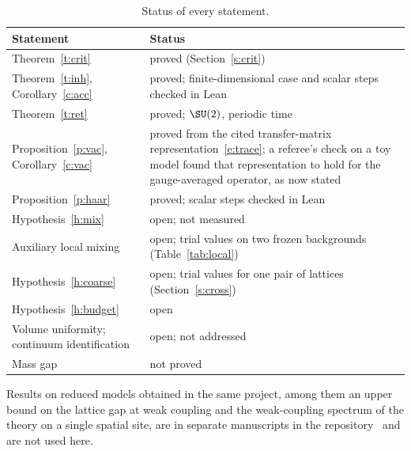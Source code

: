 \begin{table}[ht]
\centering\small
\begin{tabular}{@{}p{}p{}@{}}
\toprule
Statement & Status \\
\midrule
Theorem~\ref{t:crit} & proved (Section~\ref{s:crit}) \\
Theorem~\ref{t:inh}, Corollary~\ref{c:acc} & proved; finite-dimensional case and scalar steps checked in Lean \\
Theorem~\ref{t:ret} & proved; $\SU(2)$, periodic time \\
Proposition~\ref{p:vac}, Corollary~\ref{c:vac} & proved from the cited transfer-matrix representation~\eqref{e:trace}; a referee's check on a toy model found that representation to hold for the gauge-averaged operator, as now stated \\
Proposition~\ref{p:haar} & proved; scalar steps checked in Lean \\
Hypothesis~\ref{h:mix} & open; not measured \\
Auxiliary local mixing & open; trial values on two frozen backgrounds (Table~\ref{tab:local}) \\
Hypothesis~\ref{h:coarse} & open; trial values for one pair of lattices (Section~\ref{s:cross}) \\
Hypothesis~\ref{h:budget} & open \\
Volume uniformity; continuum identification & open; not addressed \\
Mass gap & not proved \\
\bottomrule
\end{tabular}
\caption{Status of every statement.}\label{tab:status}
\end{table}

Results on reduced models obtained in the same project, among them an upper bound on the lattice gap at weak
coupling and the weak-coupling spectrum of the theory on a single spatial site, are in separate
manuscripts in the repository~\cite{Repo} and are not used here.

